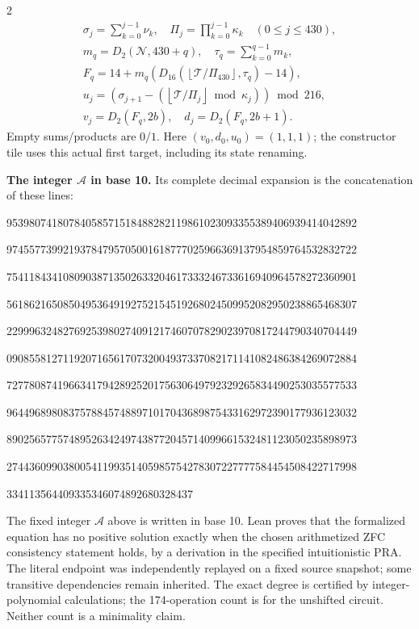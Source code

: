 \documentclass[10pt]{article}
\newcommand{\fl}[1]{\left\lfloor#1\right\rfloor}
\begin{document}
\begin{multicols}{2}
\[\begin{gathered}
\sigma_j=\sum_{k=0}^{j-1}\nu_k,\quad
\Pi_j=\prod_{k=0}^{j-1}\kappa_k\quad(0\le j\le430),\\
m_q=D_2(\mathcal N,430+q),\quad \tau_q=\sum_{k=0}^{q-1}m_k,\\
F_q=14+m_q(D_{16}(\fl{\mathcal T/\Pi_{430}},\tau_q)-14),\\
u_j=(\sigma_{j+1}-(\fl{\mathcal T/\Pi_j}\bmod\kappa_j))\bmod216,\\
v_j=D_2(F_q,2b),\quad d_j=D_2(F_q,2b+1).
\end{gathered}
\]
Empty sums/products are $0/1$. Here $(v_0,d_0,u_0)=(1,1,1)$; the constructor tile
uses this actual first target, including its state renaming.

\textbf{The integer $\mathcal A$ in base 10.}
Its complete decimal expansion is the concatenation of these lines:\par
\begingroup\fontsize{7.7}{8.2}\selectfont{}\par
95398074180784058571518488282119861023093355389406939414042892\par
97455773992193784795705001618777025966369137954859764532832722\par
75411843410809038713502633204617333246733616940964578272360901\par
56186216508504953649192752154519268024509952082950238865468307\par
22999632482769253980274091217460707829023970817244790340704449\par
09085581271192071656170732004937337082171141082486384269072884\par
72778087419663417942892520175630649792329265834490253035577533\par
96449689808375788457488971017043689875433162972390177936123032\par
89025657757489526342497438772045714099661532481123050235898973\par
27443609903800541199351405985754278307227777584454508422717998\par
334113564409335346074892680328437\par
\endgroup
\normalfont\fontsize{7.7}{8.2}\selectfont
The fixed integer $\mathcal A$ above is written in base 10. Lean proves that the formalized equation has no positive solution exactly
when the chosen arithmetized ZFC consistency statement holds, by a derivation
in the specified intuitionistic PRA. The literal endpoint was independently
replayed on a fixed source snapshot; some transitive dependencies remain
inherited. The exact degree is certified by integer-polynomial calculations;
the 174-operation count is for the unshifted circuit. Neither count is a
minimality claim.
\end{multicols}
\end{document}
